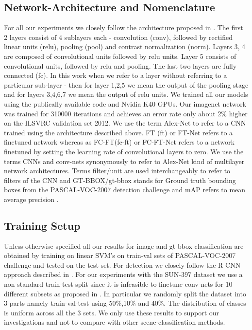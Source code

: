 \documentclass[runningheads]{llncs}
\begin{document}
\subsection{Network-Architecture and Nomenclature}
\label{sub:net-arch}
For all our experiments we closely follow the architecture proposed in \cite{Kriz}. The first 2 layers consist of 4 sublayers each - convolution (conv), followed by rectified linear units (relu), pooling (pool) and contrast normalization (norm). Layers 3, 4 are composed of convolutional units followed by relu units. Layer 5 consists of convolutional units, followed by relu and pooling. The last two layers are fully connected (fc). In this work when we refer to a layer without referring to a particular sub-layer - then for layer 1,2,5 we mean the output of the pooling stage and for layers 3,4,6,7 we mean the output of relu units. We trained all our models using the publically available code \cite{caffe} and Nvidia K40 GPUs. Our imagenet network was trained for 310000 iterations and achieves an error rate only about 2\% higher on the ILSVRC validation set 2012. \newline
We use the term Alex-Net to refer to a CNN trained using the architecture described above. FT (ft) or FT-Net refers to a finetuned network whereas as FC-FT(fc-ft) or FC-FT-Net refers to a network finetuned by setting the learning rate of convolutional layers to zero. We use the terms CNNs and conv-nets synonymously to refer to Alex-Net kind of multilayer network architectures. Terms filter/unit are used interchangeably to refer to filters of the CNN and GT-BBOX/gt-bbox stands for Ground truth bounding boxes from the PASCAL-VOC-2007 detection challenge and mAP refers to mean average precision \cite{Pascal}.

\subsection{Training Setup} 
\label{sub:train-setup}
  Unless otherwise specified all our results for image and gt-bbox classification are obtained by training on linear SVM's on train-val sets of PASCAL-VOC-2007 \cite{Pascal} challenge and tested on the test set. For detection we closely follow the R-CNN approach described in \cite{Rcnn}. \newline
For our experiments with the SUN-397 \cite{sun} dataset we use a non-standard train-test split since it is infeasible to finetune conv-nets for 10 different subsets as proposed in \cite{sun}. In particular we randomly split the dataset into 3 parts namely train-val-test using 50\%,10\% and 40\%. The distribution of classes is uniform across all the 3 sets. We only use these results to support our investigations and not to compare with other scene-classification methods.  
 
\end{document}
